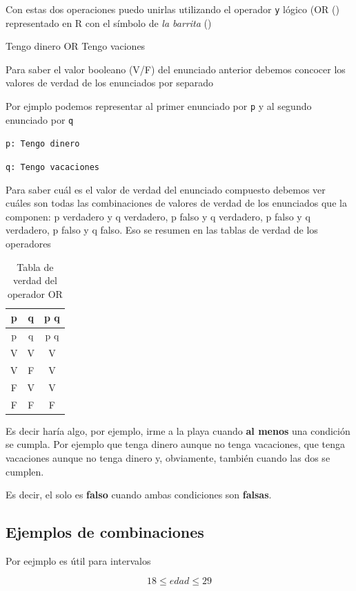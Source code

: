 \documentclass[
]{book}
\begin{document}
Con estas dos operaciones puedo unirlas utilizando el operador \texttt{y} lógico (OR (\texttt{\textbar{}}) representado en R con el símbolo de \emph{la barrita} (\texttt{\textbar{}})

Tengo dinero OR Tengo vaciones

Para saber el valor booleano (V/F) del enunciado anterior debemos concocer los valores de verdad de los enunciados por separado

Por ejmplo podemos representar al primer enunciado por \texttt{p} y al segundo enunciado por \texttt{q}

\texttt{p:\ Tengo\ dinero}

\texttt{q:\ Tengo\ vacaciones}

Para saber cuál es el valor de verdad del enunciado compuesto debemos ver cuáles son todas las combinaciones de valores de verdad de los enunciados que la componen: p verdadero y q verdadero, p falso y q verdadero, p falso y q verdadero, p falso y q falso. Eso se resumen en las tablas de verdad de los operadores

\begin{longtable}[]{@{}ccc@{}}
\caption{Tabla de verdad del operador OR}\tabularnewline
\toprule
p & q & p \textbar{} q \\
\midrule
\endfirsthead
\toprule
p & q & p \textbar{} q \\
\midrule
\endhead
V & V & V \\
V & F & V \\
F & V & V \\
F & F & F \\
\bottomrule
\end{longtable}

Es decir haría algo, por ejemplo, irme a la playa cuando \textbf{al menos} una condición se cumpla. Por ejemplo que tenga dinero aunque no tenga vacaciones, que tenga vacaciones aunque no tenga dinero y, obviamente, también cuando las dos se cumplen.

Es decir, el \texttt{\textbar{}} solo es \textbf{falso} cuando ambas condiciones son \textbf{falsas}.

\hypertarget{ejemplos-de-combinaciones}{%
\subsection{Ejemplos de combinaciones}\label{ejemplos-de-combinaciones}}

Por eejmplo es útil para intervalos

\[
18 \leq edad \leq 29 
\]
\end{document}
